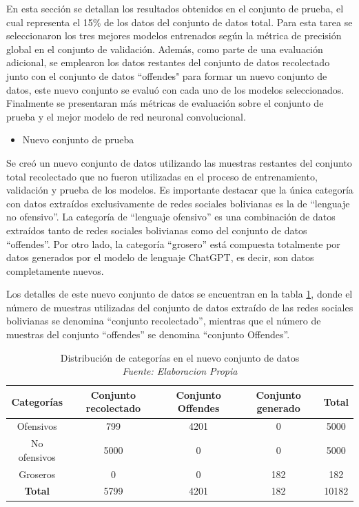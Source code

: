 En esta sección se detallan los resultados obtenidos en el conjunto de prueba, el cual representa el 15\% de los datos del conjunto de datos total. Para esta tarea se seleccionaron los tres mejores modelos entrenados según la métrica de precisión global en el conjunto de validación. Además, como parte de una evaluación adicional, se emplearon los datos restantes del conjunto de datos recolectado junto con el conjunto de datos “offendes" para formar un nuevo conjunto de datos, este nuevo conjunto se evaluó con cada uno de los modelos seleccionados. Finalmente se presentaran más métricas de evaluación sobre el conjunto de prueba y el mejor modelo de red neuronal convolucional.

\begin{itemize}
\item Nuevo conjunto de prueba
\end{itemize}
Se creó un nuevo conjunto de datos utilizando las muestras restantes del conjunto total recolectado que no fueron utilizadas en el proceso de entrenamiento, validación y prueba de los modelos. Es importante destacar que la única categoría con datos extraídos exclusivamente de redes sociales bolivianas es la de ``lenguaje no ofensivo''. La categoría de ``lenguaje ofensivo'' es una combinación de datos extraídos tanto de redes sociales bolivianas como del conjunto de datos ``offendes''. Por otro lado, la categoría ``grosero'' está compuesta totalmente por datos generados por el modelo de lenguaje ChatGPT, es decir, son datos completamente nuevos.

Los detalles de este nuevo conjunto de datos se encuentran en la tabla \ref{tbl:categorias}, donde el número de muestras utilizadas del conjunto de datos extraído de las redes sociales bolivianas se denomina ``conjunto recolectado'', mientras que el número de muestras del conjunto ``offendes'' se denomina ``conjunto Offendes''.

\begin{table}[!ht]
	\centering
	\begin{tabular}{|c|c|c|c|c|}
		\hline
		\textbf{Categorías} & \textbf{Conjunto recolectado} & \textbf{Conjunto Offendes} & \textbf{Conjunto generado} & \textbf{Total} \\ \hline
		Ofensivos & 799 & 4201 & 0 & 5000 \\ \hline
		No ofensivos & 5000 & 0 & 0 & 5000 \\ \hline
		Groseros & 0 & 0 & 182 & 182 \\ \hline
		\textbf{Total} & 5799 & 4201 & 182 & 10182 \\ \hline
	\end{tabular}
	\caption[Distribución de categorías en el nuevo conjunto de datos]{Distribución de categorías en el nuevo conjunto de datos
		\\\textit{Fuente: Elaboracion Propia}}
	\label{tbl:categorias}
\end{table}

